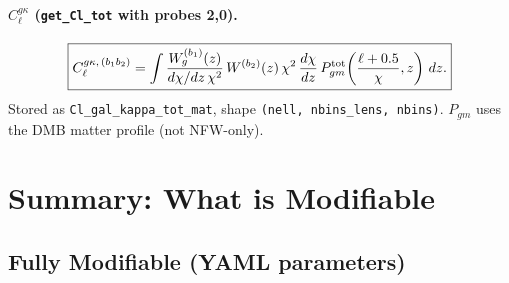 \documentclass[12pt,a4paper]{article}
\newcommand{\code}[1]{\texttt{\small #1}}
\begin{document}
\paragraph{$C_\ell^{g\kappa}$ (\code{get\_Cl\_tot} with probes 2,0).}
\begin{equation}
  \boxed{C_\ell^{g\kappa,\,(b_1 b_2)} = \int
  \frac{W_g^{(b_1)}(z)}{d\chi/dz\,\chi^2}\,
  W^{(b_2)}(z)\,
  \chi^2\,\frac{d\chi}{dz}\,
  P^{\rm tot}_{gm}\!\left(\frac{\ell+0.5}{\chi},z\right)\,dz.}
\end{equation}
Stored as \code{Cl\_gal\_kappa\_tot\_mat}, shape \code{(nell, nbins\_lens, nbins)}.
$P_{gm}$ uses the DMB matter profile (not NFW-only).

\section{Summary: What is Modifiable}
\label{sec:modifiable}

\subsection{Fully Modifiable (YAML parameters)}
\end{document}
